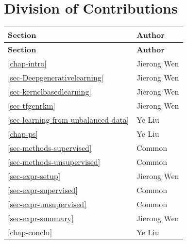 {}
\chapter*{Division of Contributions}
\begingroup
\renewcommand{\arraystretch}{1.5}
\begin{longtable}{|p{}|p{}|}
\hline
\textbf{Section} & \textbf{Author} \\
\hline
\endfirsthead
\hline
\textbf{Section} & \textbf{Author} \\
\hline
\endhead
\hline
\endfoot
\hline
\endlastfoot
\ref{chap-intro} \nameref{chap-intro} & Jierong Wen \\
\hline
\ref{sec-Deepgenerativelearning} \nameref{sec-Deepgenerativelearning} & Jierong Wen  \\
\hline
\ref{sec-kernelbasedlearning} \nameref{sec-kernelbasedlearning} & Jierong Wen \\
\hline
\ref{sec-tfgenrkm} \nameref{sec-tfgenrkm} & Jierong Wen  \\
\hline
\ref{sec-learning-from-unbalanced-data} \nameref{sec-learning-from-unbalanced-data}& Ye Liu  \\
\hline
\ref{chap-ps} \nameref{chap-ps} & Ye Liu \\ 
\hline
\ref{sec-methods-supervised} \nameref{sec-methods-supervised} & Common  \\
\hline
\ref{sec-methods-unsupervised} \nameref{sec-methods-unsupervised} & Common  \\
\hline
\ref{sec-expr-setup} \nameref{sec-expr-setup}& Jierong Wen  \\
\hline
\ref{sec-expr-supervised} \nameref{sec-expr-supervised} & Common  \\
\hline
\ref{sec-expr-unsupervised} \nameref{sec-expr-unsupervised} & Common  \\
\hline
\ref{sec-expr-summary} \nameref{sec-expr-summary} & Jierong Wen  \\
\hline
\ref{chap-conclu} \nameref{chap-conclu} & Ye Liu  \\
\hline
\end{longtable}
\endgroup